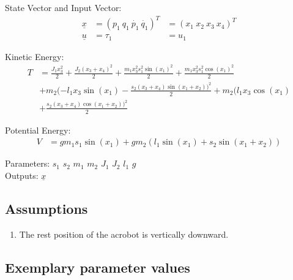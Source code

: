\documentclass[10pt,a4paper]{article}
\begin{document}
	State Vector and Input Vector:
	\begin{align*}
		\underline{x} &= (p_1 \ q_1 \ \dot{p_1} \ \dot{q_1})^T &= (x_1 \ x_2 \ x_3 \ x_4)^T \\
		\underline{u} &= \tau_1 &= u_1
	\end{align*}
	
	\noindent Kinetic Energy:			
	\begin{subequations}
	\begin{align*}
		T &= \frac{J_1x_3^2}{2} + \frac{J_2(x_3 + x_4)^2}{2} + \frac{m_1x_3^2s_1^2 \sin(x_1)^2}{2} + \frac{m_1x_3^2s_1^2 \cos(x_1)^2}{2} \\
		&+ m_2(-l_1x_3 \sin(x_1) - \frac{s_2(x_3 + x_4) \sin(x_1 + x_2))^2}{2} + m_2(l_1x_3 \cos(x_1) \\
		&+ \frac{s_2(x_3 + x_4) \cos(x_1 + x_2))^2}{2}
	\end{align*}
	\end{subequations}
	
	\noindent Potential Energy:			
	\begin{subequations}
	\begin{align*}
		V &= gm_1s_1\sin(x_1) + gm_2(l_1\sin(x_1) + s_2\sin(x_1 + x_2))
	\end{align*}
	\end{subequations}

	\noindent
	Parameters: $s_1$ $s_2$ $m_1$ $m_2$ $J_1$ $J_2$ $l_1$ $g$ %
	\\
	Outputs: $\underline{x}$ %
	
	
	\subsection{Assumptions} %
		\begin{enumerate} %
			\item The rest position of the acrobot is vertically downward.  
		\end{enumerate}
	
	
	\subsection{Exemplary parameter values}
	
\end{document}
